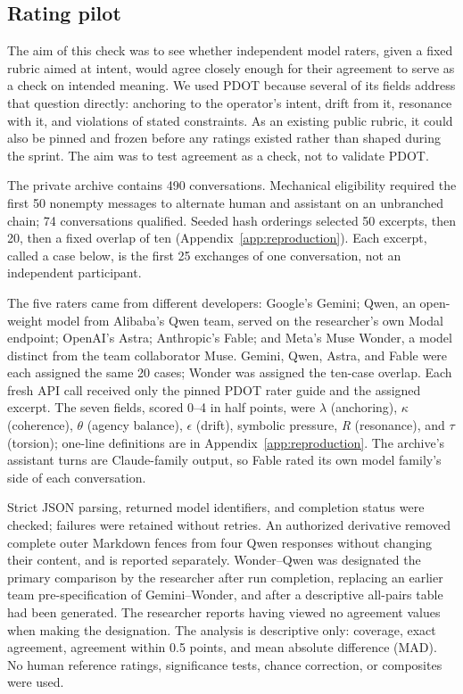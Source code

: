 \documentclass[11pt]{article}
\begin{document}
\subsection{Rating pilot}
The aim of this check was to see whether independent model raters, given a fixed rubric aimed at intent, would agree closely enough for their agreement to serve as a check on intended meaning. We used PDOT because several of its fields address that question directly: anchoring to the operator's intent, drift from it, resonance with it, and violations of stated constraints. As an existing public rubric, it could also be pinned and frozen before any ratings existed rather than shaped during the sprint. The aim was to test agreement as a check, not to validate PDOT.

The private archive contains 490 conversations. Mechanical eligibility required the first 50 nonempty messages to alternate human and assistant on an unbranched chain; 74 conversations qualified. Seeded hash orderings selected 50 excerpts, then 20, then a fixed overlap of ten (Appendix~\ref{app:reproduction}). Each excerpt, called a case below, is the first 25 exchanges of one conversation, not an independent participant.

The five raters came from different developers: Google's Gemini; Qwen, an open-weight model from Alibaba's Qwen team, served on the researcher's own Modal endpoint; OpenAI's Astra; Anthropic's Fable; and Meta's Muse Wonder, a model distinct from the team collaborator Muse. Gemini, Qwen, Astra, and Fable were each assigned the same 20 cases; Wonder was assigned the ten-case overlap. Each fresh API call received only the pinned PDOT rater guide and the assigned excerpt. The seven fields, scored 0--4 in half points, were $\lambda$ (anchoring), $\kappa$ (coherence), $\theta$ (agency balance), $\epsilon$ (drift), symbolic pressure, \textit{R} (resonance), and $\tau$ (torsion); one-line definitions are in Appendix~\ref{app:reproduction}. The archive's assistant turns are Claude-family output, so Fable rated its own model family's side of each conversation.

Strict JSON parsing, returned model identifiers, and completion status were checked; failures were retained without retries. An authorized derivative removed complete outer Markdown fences from four Qwen responses without changing their content, and is reported separately. Wonder--Qwen was designated the primary comparison by the researcher after run completion, replacing an earlier team pre-specification of Gemini--Wonder, and after a descriptive all-pairs table had been generated. The researcher reports having viewed no agreement values when making the designation.
The analysis is descriptive only: coverage, exact agreement, agreement within 0.5 points, and mean absolute difference (MAD). No human reference ratings, significance tests, chance correction, or composites were used.
\end{document}
